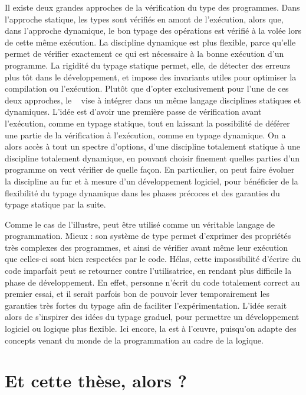 Il existe deux grandes approches de la vérification du type des programmes.
Dans l’approche statique,
les types sont vérifiés en amont de l’exécution, alors que, dans l’approche dynamique, le bon typage des opérations est vérifié à la volée lors de cette même exécution.
La discipline dynamique est plus flexible, parce qu’elle permet de vérifier exactement ce qui est nécessaire à la bonne exécution d’un programme.
La rigidité du typage statique permet, elle, de détecter des erreurs plus tôt dans le développement, et impose des invariants utiles pour optimiser la compilation ou l’exécution.
Plutôt que d’opter exclusivement pour l’une de ces deux approches,
le ~ vise à intégrer
dans un même langage disciplines statiques et dynamiques.
L’idée est d’avoir une première passe de vérification avant l’exécution, comme en typage statique, tout en laissant la possibilité de déférer une partie de la vérification à l’exécution, comme en typage dynamique.
On a alors accès à tout un spectre d’options,
d’une discipline totalement statique à une discipline totalement dynamique,
en pouvant choisir finement quelles parties d’un programme on veut vérifier de quelle façon.
En particulier, on peut faire évoluer la discipline au fur et à mesure d’un développement
logiciel, pour bénéficier de la flexibilité du typage dynamique dans les phases précoces et des
garanties du typage statique par la suite.

Comme le cas de  l’illustre,  peut être utilisé comme un véritable langage
de programmation. Mieux : son système de type 
permet d’exprimer des propriétés très complexes des programmes, et ainsi de vérifier
avant même leur exécution que celles-ci sont bien respectées par le code.
Hélas, cette impossibilité d’écrire du code imparfait peut
se retourner contre l’utilisatrice, en rendant plus difficile la phase de développement.
En effet, personne n’écrit du code totalement correct au premier essai,
et il serait parfois bon de pouvoir lever temporairement
les garanties très fortes du typage afin de faciliter l’expérimentation.
L’idée serait alors de s’inspirer des idées du typage graduel, pour permettre un développement
logiciel ou logique plus flexible. Ici encore, la 
est à l’œuvre, puisqu’on adapte des concepts venant du monde de la programmation
au cadre de la logique.

\section{Et cette thèse, alors ?}
\label{sec:cette-these}

